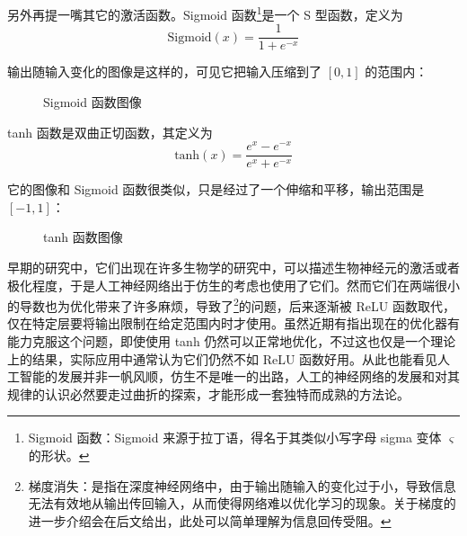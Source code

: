 另外再提一嘴其它的激活函数。Sigmoid 函数\footnote{Sigmoid 函数：Sigmoid 来源于拉丁语，得名于其类似小写字母 sigma 变体 $\varsigma$ 的形状。}是一个 S 型函数，定义为
\[
    \text{Sigmoid}(x) = \frac{1}{1 + e^{-x}}
\]

输出随输入变化的图像是这样的，可见它把输入压缩到了 $[0, 1]$ 的范围内：
\begin{figure}[H]
\centering
{}
\caption{Sigmoid 函数图像}
\end{figure}

tanh 函数是双曲正切函数，其定义为
\[
    \text{tanh}(x) = \frac{e^x - e^{-x}}{e^x + e^{-x}}
\]

它的图像和 Sigmoid 函数很类似，只是经过了一个伸缩和平移，输出范围是 $[-1, 1]$：
\begin{figure}[H]
\centering
{}
\caption{tanh 函数图像}
\end{figure}

早期的研究中，它们出现在许多生物学的研究中，可以描述生物神经元的激活或者极化程度，于是人工神经网络出于仿生的考虑也使用了它们。然而它们在两端很小的导数也为优化带来了许多麻烦，导致了\footnote{梯度消失：是指在深度神经网络中，由于输出随输入的变化过于小，导致信息无法有效地从输出传回输入，从而使得网络难以优化学习的现象。关于梯度的进一步介绍会在后文给出，此处可以简单理解为信息回传受阻。}的问题，后来逐渐被 ReLU 函数取代，仅在特定层要将输出限制在给定范围内时才使用。虽然近期有指出现在的优化器有能力克服这个问题，即使使用 tanh 仍然可以正常地优化，不过这也仅是一个理论上的结果，实际应用中通常认为它们仍然不如 ReLU 函数好用。从此也能看见人工智能的发展并非一帆风顺，仿生不是唯一的出路，人工的神经网络的发展和对其规律的认识必然要走过曲折的探索，才能形成一套独特而成熟的方法论。

